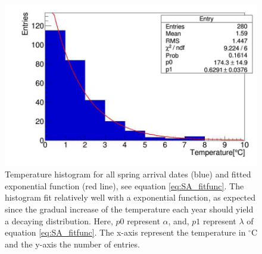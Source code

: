 \documentclass[a4paper,12pt]{article}
\begin{document}
\begin{figure}[htb]
	\centering
	\includegraphics[scale=.4]{../Code/springArrive_tempHist.jpg}
	\caption{Temperature histogram for all spring arrival dates (blue) and 
	fitted exponential function (red line), see equation 
	\eqref{eq:SA_fitfunc}. The histogram fit relatively well with a 
	exponential function, as expected since the gradual increase of the 
	temperature each year should yield a decaying distribution. Here, 
	$p0$ represent $\alpha$, and, $p1$ represent $\lambda$ of equation 
	\eqref{eq:SA_fitfunc}. The x-axis represent the temperature in 
	$^\circ$C and the y-axis the number of entries.}
	\label{fig:SA_tempHist}
\end{figure}
\end{document}
